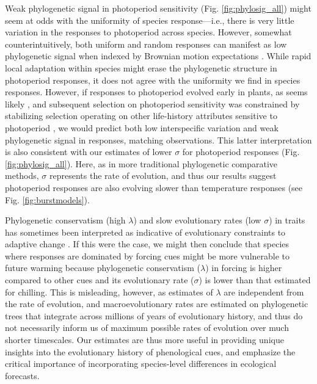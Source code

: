 \documentclass[11pt]{article}
\begin{document}
Weak phylogenetic signal in photoperiod sensitivity (Fig. \ref{fig:phylosig_all}) might seem at odds with the uniformity of species response---i.e., there is very little variation in the responses to photoperiod across species. However, somewhat counterintuitively, both uniform and random responses can manifest as low phylogenetic signal when indexed by Brownian motion expectations \citep{wiens2010niche}. While rapid local adaptation within species might erase the phylogenetic structure in photoperiod responses, it does not agree with the uniformity we find in species responses. However, if responses to photoperiod evolved early in plants, as seems likely \citep{serrano2017}, and subsequent selection on photoperiod sensitivity was constrained by stabilizing selection operating on other life-history attributes sensitive to photoperiod \citep[e.g.,][]{Rinne:1994,Wilczek2014,azeez2015}, we would predict both low interspecific variation and weak phylogenetic signal in responses, matching observations. This latter interpretation is also consistent with our estimates of lower $\sigma$ for photoperiod responses (Fig. \ref{fig:phylosig_all}). Here, as in more traditional phylogenetic comparative methods, $\sigma$ represents the rate of evolution, and thus our results suggest photoperiod responses are also evolving slower than temperature responses (see Fig. \ref{fig:burstmodels}).

Phylogenetic conservatism (high $\lambda$) and slow evolutionary rates (low $\sigma$) in traits has sometimes been interpreted as indicative of evolutionary constraints to adaptive change \citep{wiens2010niche,bennett2021evolution}. If this were the case, we might then conclude that species where responses are dominated by forcing cues might be more vulnerable to future warming because phylogenetic conservatism ($\lambda$) in forcing is higher compared to other cues and its evolutionary rate ($\sigma$) is lower than that estimated for chilling. This is misleading, however, as estimates of $\lambda$ are independent from the rate of evolution, and macroevolutionary rates are estimated on phylogenetic trees that integrate across millions of years of evolutionary history, and thus do not necessarily inform us of maximum possible rates of evolution over much shorter timescales. Our estimates are thus more useful in providing unique insights into the evolutionary history of phenological cues, and emphasize the critical importance of incorporating species-level differences in ecological forecasts.
\end{document}
